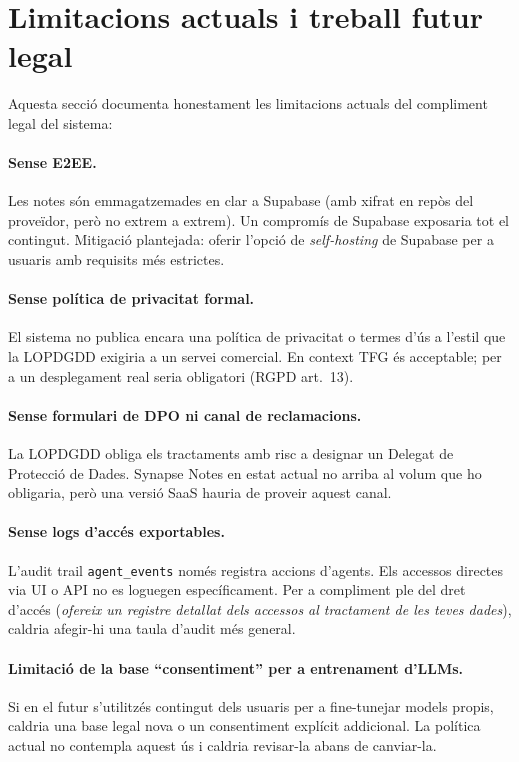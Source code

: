 \section{Limitacions actuals i treball futur legal}
\label{sec:legislacio-limitacions}

Aquesta secció documenta honestament les limitacions actuals del compliment legal del sistema:

\paragraph{Sense E2EE.} Les notes són emmagatzemades en clar a Supabase (amb xifrat en repòs del proveïdor, però no extrem a extrem). Un compromís de Supabase exposaria tot el contingut. Mitigació plantejada: oferir l'opció de \emph{self-hosting} de Supabase per a usuaris amb requisits més estrictes.

\paragraph{Sense política de privacitat formal.} El sistema no publica encara una política de privacitat o termes d'ús a l'estil que la LOPDGDD exigiria a un servei comercial. En context TFG és acceptable; per a un desplegament real seria obligatori (RGPD art.~13).

\paragraph{Sense formulari de DPO ni canal de reclamacions.} La LOPDGDD obliga els tractaments amb risc a designar un Delegat de Protecció de Dades. Synapse Notes en estat actual no arriba al volum que ho obligaria, però una versió SaaS hauria de proveir aquest canal.

\paragraph{Sense logs d'accés exportables.} L'audit trail \texttt{agent\_events} només registra accions d'agents. Els accessos directes via UI o API no es loguegen específicament. Per a compliment ple del dret d'accés (\emph{ofereix un registre detallat dels accessos al tractament de les teves dades}), caldria afegir-hi una taula d'audit més general.

\paragraph{Limitació de la base ``consentiment'' per a entrenament d'LLMs.} Si en el futur s'utilitzés contingut dels usuaris per a fine-tunejar models propis, caldria una base legal nova o un consentiment explícit addicional. La política actual no contempla aquest ús i caldria revisar-la abans de canviar-la.
